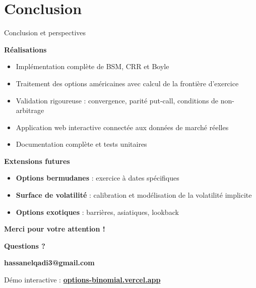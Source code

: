 \documentclass[aspectratio=169]{beamer}
\begin{document}
\section{Conclusion}

\begin{frame}{Conclusion et perspectives}
  \small
  
  \vspace{2mm}
  \textbf{Réalisations}
  \begin{itemize}\scriptsize
    \item Implémentation complète de BSM, CRR et Boyle
    \item Traitement des options américaines avec calcul de la frontière d'exercice
    \item Validation rigoureuse : convergence, parité put-call, conditions de non-arbitrage
    \item Application web interactive connectée aux données de marché réelles
    \item Documentation complète et tests unitaires
  \end{itemize}
  
  \vspace{-2mm}
  \textbf{Extensions futures}
  \begin{itemize}\scriptsize
    \item \textbf{Options bermudanes} : exercice à dates spécifiques
    \item \textbf{Surface de volatilité} : calibration et modélisation de la volatilité implicite
    \item \textbf{Options exotiques} : barrières, asiatiques, lookback
  \end{itemize}
\end{frame}

\begin{frame}[plain]
  \begin{center}
    \vspace{15mm}
    {\Huge \textbf{Merci pour votre attention !}}
    
    \vspace{10mm}
    {\Large \textbf{Questions ?}}
    
    \vspace{12mm}
    {\small \textcolor{Primary}{\textbf{hassanelqadi3@gmail.com}}}
    
    \vspace{2mm}
    {\small Démo interactive : \href{https://options-binomial.vercel.app}{\textcolor{Secondary}{\textbf{options-binomial.vercel.app}}}}
  \end{center}
\end{frame}
\end{document}
